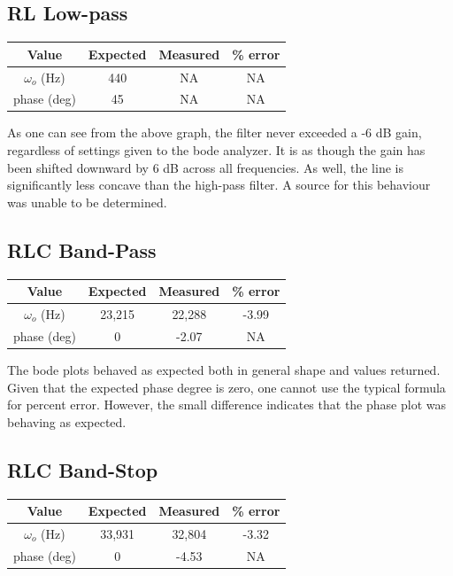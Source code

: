 \documentclass[journal]{IEEEtran}
\begin{document}
\subsection{RL Low-pass}


\begin{tabular}{|c|c|c|c|}
\hline
Value & Expected & Measured & \% error \\
\hline
$\omega_{o}$ (Hz) & 440 & NA & NA\\
\hline
phase (deg) & 45 & NA & NA\\
\hline
\end{tabular}

As one can see from the above graph, the filter never exceeded a -6 dB gain, regardless of settings given to the bode analyzer. It is as though the gain has been shifted downward by 6 dB across all frequencies. As well, the line is significantly less concave than the high-pass filter. A source for this behaviour was unable to be determined.

\subsection{RLC Band-Pass}


\begin{tabular}{|c|c|c|c|}
\hline
Value & Expected & Measured & \% error \\
\hline
$\omega_{o}$ (Hz) & 23,215 & 22,288 & -3.99\\
\hline
phase (deg) & 0 & -2.07 & NA\\
\hline
\end{tabular}

The bode plots behaved as expected both in general shape and values returned. Given that the expected phase degree is zero, one cannot use the typical formula for percent error. However, the small difference indicates that the phase plot was behaving as expected. 

\subsection{RLC Band-Stop}


\begin{tabular}{|c|c|c|c|}
\hline
Value & Expected & Measured & \% error \\
\hline
$\omega_{o}$ (Hz) & 33,931 & 32,804 & -3.32\\
\hline
phase (deg) & 0 & -4.53 & NA\\
\hline
\end{tabular}
\end{document}
